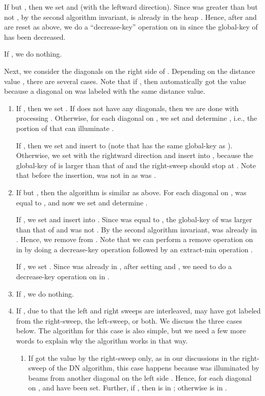 \documentclass[english,runningheads,11pt]{llncs-revised}
\begin{document}
If  but , then we set
 and  (with the leftward direction).
Since  was greater than  but not , by the second algorithm invariant,
 is already in the heap .
Hence, after  and   are reset as above, we do
a ``decrease-key'' operation on  in  since the global-key of  has been decreased.

If , we do nothing.


Next, we consider the diagonals on the right side  of . Depending on the
distance value , there are several cases. Note that if
, then
 automatically got the value  because a diagonal  on
 was labeled with the same distance value.

\begin{enumerate}
\item
If , then we set . If  does not
have any diagonals, then we are done with processing . Otherwise,
for each diagonal  on , we set  and determine
, i.e., the portion of  that can illuminate .


If , then we set  and insert  to  (note that  has the same global-key as ).
Otherwise, we set  with the rightward direction and insert  into , because the global-key of  is larger than that of  and the right-sweep should stop at . Note that before the insertion,  was not in  as  was .

\item
If  but , then the algorithm is
similar as above. For each diagonal  on ,  was equal to , and now we set  and determine .

If ,
we set  and insert  into .
Since  was equal to , the global-key of  was larger than that of  and  was not . By the second algorithm invariant,  was already in .
Hence, we remove  from . Note that we can perform a remove operation on  in
 by doing a decrease-key operation followed by an extract-min
operation \cite{ref:CLRS09}.

If , we set .
Since   was already in ,
after setting  and  ,  we need to do a
decrease-key operation on  in .

\item
If , we do nothing.

\item
If , due to that the left and right sweeps are
interleaved,  may have got labeled from the right-sweep, the
left-sweep, or both.
We discuss the three cases below. The algorithm for this case is also simple, but we need a few more words to explain why the algorithm works in that way.

\begin{enumerate}
\item
If  got the value  by the right-sweep only, as in
our discussions in the right-sweep of the DN algorithm,
this case happens because  was illuminated by beams from
another diagonal  on the left side . Hence, for each
diagonal  on ,  and  have been set.
Further, if , then  is in ; otherwise 
is in .


\end{enumerate}
\end{enumerate}
\end{document}
